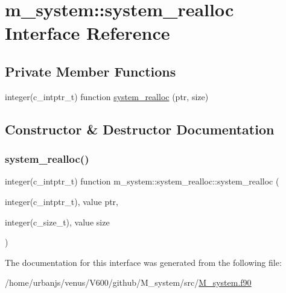 \hypertarget{interfacem__system_1_1system__realloc}{}\section{m\+\_\+system\+:\+:system\+\_\+realloc Interface Reference}
\label{interfacem__system_1_1system__realloc}
\subsection*{Private Member Functions}
\begin{DoxyCompactItemize}
\item 
integer(c\+\_\+intptr\+\_\+t) function \mbox{\hyperlink{interfacem__system_1_1system__realloc_a74594da043de33a91cc3199083c8cd7c}{system\+\_\+realloc}} (ptr, size)
\end{DoxyCompactItemize}


\subsection{Constructor \& Destructor Documentation}
\mbox{\label{interfacem__system_1_1system__realloc_a74594da043de33a91cc3199083c8cd7c}} 
\subsubsection{\texorpdfstring{system\+\_\+realloc()}{system\_realloc()}}
{\footnotesize\ttfamily integer(c\+\_\+intptr\+\_\+t) function m\+\_\+system\+::system\+\_\+realloc\+::system\+\_\+realloc (\begin{DoxyParamCaption}\item[{integer(c\+\_\+intptr\+\_\+t), value}]{ptr,  }\item[{integer(c\+\_\+size\+\_\+t), value}]{size }\end{DoxyParamCaption})\hspace{0.3cm}{\ttfamily [private]}}



The documentation for this interface was generated from the following file\+:\begin{DoxyCompactItemize}
\item 
/home/urbanjs/venus/\+V600/github/\+M\+\_\+system/src/\mbox{\hyperlink{M__system_8f90}{M\+\_\+system.\+f90}}\end{DoxyCompactItemize}
